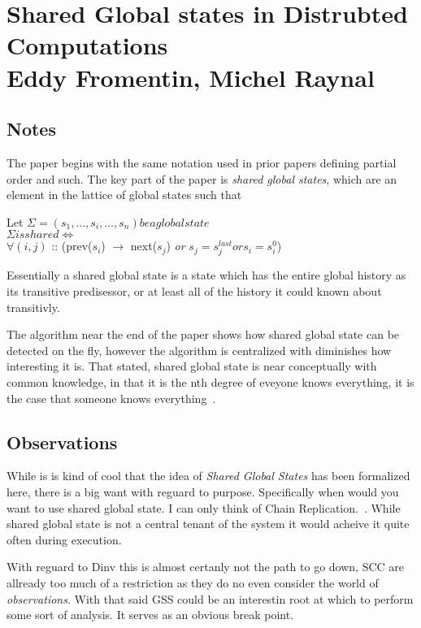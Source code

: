 \section{Shared Global states in Distrubted Computations \\ \small{Eddy
Fromentin, Michel Raynal}}

\subsection{Notes}

The paper begins with the same notation used in prior papers defining partial order and such. The key part of the paper is \textit{shared global states}, which are an element in the lattice of global states such that 

Let $\Sigma = (s_1,\dots,s_i,\dots,s_n) be a global state$ \\
$\Sigma is shared \iff $\\

$\forall (i,j)$ :: (prev($s_i$) $\rightarrow$ next($s_j$) \textit{or} $s_j =
s_j^{last} or s_i = s_i^0$)

Essentially a shared global state is a state which has the entire global
history as its transitive predisessor, or at least all of the history it could
known about transitivly.

The algorithm near the end of the paper shows how shared global state can be
detected on the fly, however the algorithm is centralized with diminishes how
interesting it is. That stated, shared global state is near conceptually with
common knowledge, in that it is the nth degree of eveyone knows everything, it
is the case that someone knows everything~\cite{Halpern:1990:KCK:79147.79161}.

\subsection{Observations}

While is is kind of cool that the idea of \textit{Shared Global States} has
been formalized here, there is a big want with reguard to purpose. Specifically
when would you want to use shared global state. I can only think of Chain
Replication.~\cite{vanRenesse:2004:CRS:1251254.1251261}. While shared global
state is not a central tenant of the system it would acheive it quite often
during execution.

With reguard to Dinv this is almost certanly not the path to go down, SCC are
allready too much of a restriction as they do no even consider the world of
\textit{observations}. With that said GSS could be an interestin root at which
to perform some sort of analysis. It serves as an obvious break point.


